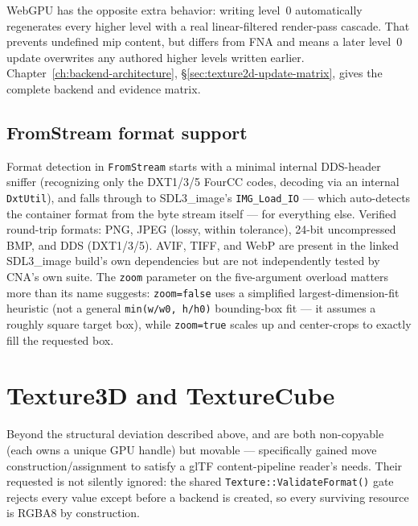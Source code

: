 WebGPU has the opposite extra behavior: writing level~0 automatically regenerates every
higher level with a real linear-filtered render-pass cascade. That prevents undefined mip
content, but differs from FNA and means a later level~0 update overwrites any authored
higher levels written earlier. Chapter~\ref{ch:backend-architecture},
\S\ref{sec:texture2d-update-matrix}, gives the complete backend and evidence matrix.

\subsection{FromStream format support}
\label{sec:texture-streams}

Format detection in \texttt{FromStream} starts with a minimal internal DDS-header sniffer
(recognizing only the DXT1/3/5 FourCC codes, decoding via an internal \texttt{DxtUtil}), and
falls through to SDL3\_image's \texttt{IMG\_Load\_IO} --- which auto-detects the container
format from the byte stream itself --- for everything else. Verified round-trip formats:
PNG, JPEG (lossy, within tolerance), 24-bit uncompressed BMP, and DDS (DXT1/3/5). AVIF, TIFF,
and WebP are present in the linked SDL3\_image build's own dependencies but are not
independently tested by CNA's own suite. The \texttt{zoom} parameter on the five-argument
overload matters more than its name suggests: \texttt{zoom=false} uses a simplified
largest-dimension-fit heuristic (not a general \texttt{min(w/w0, h/h0)} bounding-box fit --- it
assumes a roughly square target box), while \texttt{zoom=true} scales up and center-crops to
exactly fill the requested box.

\section{Texture3D and TextureCube}

Beyond the structural deviation described above,  and
 are both non-copyable (each owns a unique GPU handle) but movable ---
 specifically gained move construction/assignment to satisfy a glTF
content-pipeline reader's needs. Their requested  is not silently
ignored: the shared \texttt{Texture::ValidateFormat()} gate rejects every value except
 before a backend is created, so every surviving resource is
RGBA8 by construction.

